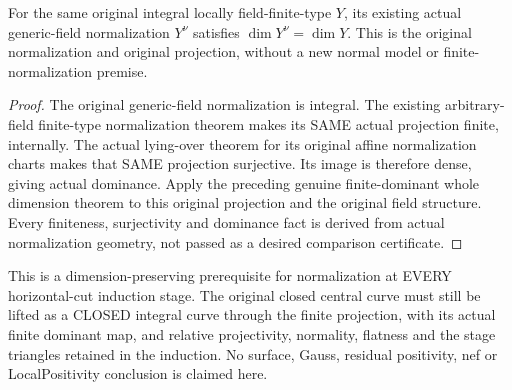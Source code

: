 \begin{corollary}
\label{cor:pl-gauss-original-normalization-whole-dimension}
\leanok
For the same original integral locally field-finite-type $Y$, its
existing actual generic-field normalization $Y^\nu$ satisfies
$\dim Y^\nu=\dim Y$. This is the original normalization and original
projection, without a new normal model or finite-normalization premise.
\end{corollary}
\begin{proof}
The original generic-field normalization is integral. The existing
arbitrary-field finite-type normalization theorem makes its SAME
actual projection finite, internally. The actual lying-over theorem
for its original affine normalization charts makes that SAME projection
surjective. Its image is therefore dense, giving actual dominance.
Apply the preceding genuine finite-dominant whole dimension theorem
to this original projection and the original field structure. Every
finiteness, surjectivity and dominance fact is derived from actual
normalization geometry, not passed as a desired comparison certificate.
\end{proof}

This is a dimension-preserving prerequisite for normalization at EVERY
horizontal-cut induction stage. The original closed central curve
must still be lifted as a CLOSED integral curve through the finite
projection, with its actual finite dominant map, and relative projectivity,
normality, flatness and the stage triangles retained in the induction.
No surface, Gauss, residual positivity, nef or LocalPositivity conclusion
is claimed here.

